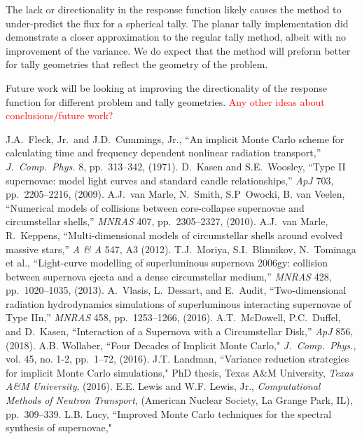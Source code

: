 \documentclass[]{article}
\begin{document}
The lack or directionality in the response function likely causes the method to under-predict the flux for a spherical tally. The planar tally implementation did demonstrate a closer approximation to the regular tally method, albeit with no improvement of the variance. We do expect that the method will preform better for tally geometries that reflect the geometry of the problem.

Future work will be looking at improving the directionality of the response function for different problem and tally geometries.
\textcolor{red}{Any other ideas about conclusions/future work?}

\newpage

\begin{thebibliography}{99}
 J.A.\ Fleck, Jr.\ and J.D.\ Cummings, Jr., ``An implicit Monte Carlo scheme for calculating time and frequency dependent nonlinear radiation transport,''
  	{\em J.\ Comp.\ Phys.} 8, pp.\ 313--342, (1971).
 D.\ Kasen and S.E.\ Woosley, ``Type II supernovae: model light curves and standard candle relationships,''
  	{\em ApJ} 703, pp.\ 2205--2216, (2009).
 A.J.\ van Marle, N.\ Smith, S.P\ Owocki, B. van Veelen, ``Numerical models of collisions between core-collapse supernovae and circumstellar shells,''
	{\em MNRAS} 407, pp.\ 2305--2327, (2010).
 A.J.\ van Marle, R.\ Keppens, ``Multi-dimensional models of circumstellar shells around evolved massive stars,''
	{\em A \& A} 547, A3 (2012).
 T.J.\ Moriya, S.I.\ Blinnikov, N.\ Tominaga et al., ``Light-curve modelling of superluminous supernova 2006gy: collision between supernova ejecta and a dense circumstellar medium,''
  	{\em MNRAS} 428, pp.\ 1020--1035, (2013).
 A.\ Vlasis, L.\ Dessart, and E.\ Audit, ``Two-dimensional radiation hydrodynamics simulations of superluminous interacting supernovae of Type IIn,''
  	{\em MNRAS} 458, pp.\ 1253--1266, (2016).
 A.T.\ McDowell, P.C.\ Duffel, and D.\ Kasen, ``Interaction of a Supernova with a Circumstellar Disk,''
  	{\em ApJ} 856, (2018).
 A.B. Wollaber, ``Four Decades of Implicit Monte Carlo," 
  	{\em J.\ Comp.\ Phys.}, vol. 45, no. 1-2, pp.\ 1--72, (2016).
 J.T. Landman, ``Variance reduction strategies for implicit Monte Carlo simulations," PhD thesis, Texas A\&M University, 
   	{\em Texas A\&M University}, (2016).
 E.E. Lewis and W.F. Lewis, Jr., {\em Computational Methods of Neutron Transport}, (American Nuclear Society, La Grange Park, IL), pp.\ 309--339. 
 L.B. Lucy, ``Improved Monte Carlo techniques for the spectral synthesis of supernovae," 

\end{thebibliography}
\end{document}
